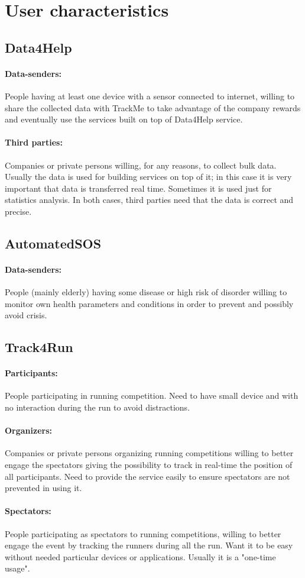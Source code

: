 \documentclass[../../rasd.tex]{subfiles}
\begin{document}
\section{User characteristics}
			\subsection{Data4Help}
				\paragraph{Data-senders:}
				People having at least one device with a sensor connected to internet, willing to share the collected data with TrackMe to take advantage of the company rewards and eventually use the services built on top of Data4Help service.
				\paragraph{Third parties:}
				Companies or private persons willing, for any reasons, to collect bulk data. Usually the data is used for building services on top of it; in this case it is very important that data is transferred real time. Sometimes it is used just for statistics analysis. In both cases, third parties need that the data is correct and precise. 
			\subsection{AutomatedSOS}
				\paragraph{Data-senders:}
				People (mainly elderly) having some disease or high risk of disorder willing to monitor own health parameters and conditions in order to prevent and possibly avoid crisis.
			\subsection{Track4Run}
				\paragraph{Participants:}
				People participating in running competition. Need to have small device and with no interaction during the run to avoid distractions.
				\paragraph{Organizers:}
				Companies or private persons organizing running competitions willing to better engage the spectators giving the possibility to track in real-time the position of all participants. Need to provide the service easily to ensure spectators are not prevented in using it.
				\paragraph{Spectators:}
				People participating as spectators to running competitions, willing to better engage the event by tracking the runners during all the run. Want it to be easy without needed particular devices or applications. Usually it is a "one-time usage".
\end{document}
